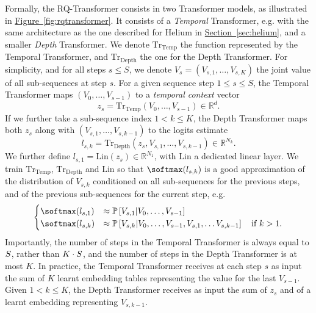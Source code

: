 Formally, the RQ-Transformer consists in two Transformer models, as illustrated in \hyperref[fig:rqtransformer]{Figure~\ref{fig:rqtransformer}}. It consists of a \emph{Temporal} Transformer, e.g. with the same architecture as the one described for Helium in \hyperref[sec:helium]{Section~\ref{sec:helium}},
and a smaller \emph{Depth} Transformer.
We denote $\mathrm{Tr}_{\mathrm{Temp}}$ the function represented by the Temporal Transformer, and $\mathrm{Tr}_{\mathrm{Depth}}$ the one for the Depth Transformer. 
For simplicity, and for all steps $s\leq S$, we denote $V_{s} = (V_{s,1}, \ldots, V_{s, K})$ the joint value of all sub-sequences at step $s$.
For a given sequence step $1 \leq s \leq S$,
the Temporal Transformer maps $(V_0, \ldots, V_{s - 1})$ to a \emph{temporal context} vector \begin{equation}
z_s = \mathrm{Tr}_{\mathrm{Temp}}(V_0, \ldots, V_{s - 1}) \in \mathbb{R}^d.
\end{equation}
If we further take a sub-sequence index $1 < k \leq K$, the Depth Transformer maps both $z_s$ along with $(V_{s, 1}, \ldots, V_{s, k - 1})$ to the logits estimate 
\begin{equation}
    l_{s, k} = \mathrm{Tr}_{\mathrm{Depth}}(z_s, V_{s, 1}, \ldots, V_{s, k - 1}) \in \mathbb{R}^{N_k}.
\end{equation}
We further define $l_{s, 1} = \mathrm{Lin}(z_s) \in \mathbb{R}^{N_1}$, with $\mathrm{Lin}$ a dedicated linear layer. We train $\mathrm{Tr}_{\mathrm{Temp}}$, $\mathrm{Tr}_{\mathrm{Depth}}$ and $\mathrm{Lin}$ so that 
$\softmax(l_{s, k})$ is a good approximation of the distribution of $V_{s, k}$ conditioned on all sub-sequences for the previous steps, and of the previous sub-sequences for the current step, e.g.
\begin{equation}
\begin{cases}
    \softmax(l_{s, 1}) &\approx \proba{V_{s, 1} | V_{0}, \ldots, V_{s-1}}\\
    \softmax(l_{s, k}) &\approx \proba{V_{s, k} | V_{0}, \ldots, V_{s-1}, V_{s, 1}, \ldots V_{s, k - 1}} \quad \text{if $k > 1$}.
\end{cases}
\end{equation}
Importantly, the number of steps in the Temporal Transformer is always equal to $S$, rather than $K \cdot S$, and the number of steps in the Depth Transformer is at most $K$.
In practice, the Temporal Transformer receives at each step $s$ as input the sum of $K$ learnt embedding tables representing the value for the last $V_{s - 1}$. 
Given $1 < k \leq K$,  the Depth Transformer receives as input the sum of $z_s$ and of a learnt embedding representing $V_{s, k - 1}$.

